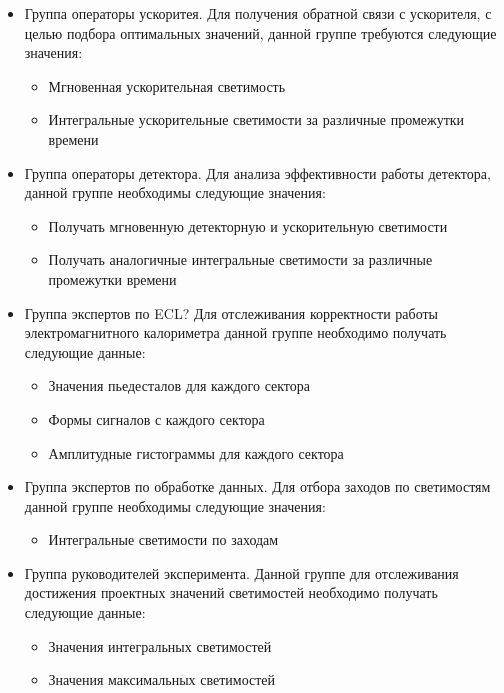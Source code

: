 \begin{itemize}

  \item Группа операторы ускоритея. Для получения обратной связи с ускорителя, с целью подбора оптимальных значений, данной группе требуются следующие значения:
    \begin{itemize}
      \item Мгновенная ускорительная светимость
      \item Интегральные ускорительные светимости за различные промежутки времени
    \end{itemize}

  \item Группа операторы детектора. Для анализа эффективности работы детектора, данной группе необходимы следующие значения:
    \begin{itemize}
      \item Получать мгновенную детекторную и ускорительную светимости
      \item Получать аналогичные интегральные светимости за различные промежутки времени 
    \end{itemize}

  \item Группа экспертов по ECL? Для отслеживания корректности работы электромагнитного калориметра данной группе необходимо получать следующие данные:
    \begin{itemize}
      \item Значения пьедесталов для каждого сектора
      \item Формы сигналов с каждого сектора 
      \item Амплитудные гистограммы для каждого сектора 
    \end{itemize}

  \item Группа экспертов по обработке данных. Для отбора заходов по светимостям данной группе необходимы следующие значения:
    \begin{itemize}
      \item Интегральные светимости по заходам
    \end{itemize}

  \item Группа руководителей эксперимента. Данной группе для отслеживания достижения проектных значений светимостей необходимо получать следующие данные:
    \begin{itemize}
      \item Значения интегральных светимостей
      \item Значения максимальных светимостей
    \end{itemize}

\end{itemize}
